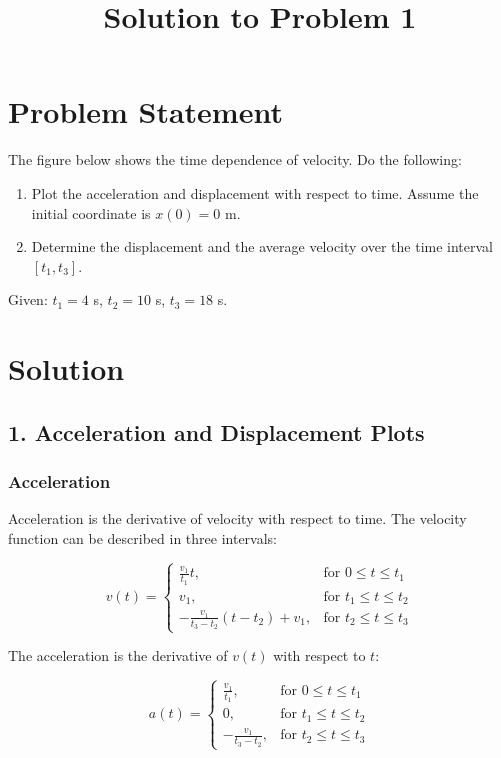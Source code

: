\documentclass{article}
\begin{document}
\title{Solution to Problem 1}
\author{}
\date{}
\maketitle

\section*{Problem Statement}
The figure below shows the time dependence of velocity. Do the following:

\begin{enumerate}
    \item Plot the acceleration and displacement with respect to time. Assume the initial coordinate is $x(0) = 0$ m.
    \item Determine the displacement and the average velocity over the time interval $[t_1, t_3]$.
\end{enumerate}

Given: $t_1 = 4$ s, $t_2 = 10$ s, $t_3 = 18$ s.

\section*{Solution}

\subsection*{1. Acceleration and Displacement Plots}

\subsubsection*{Acceleration}
Acceleration is the derivative of velocity with respect to time. The velocity function can be described in three intervals:

\[
v(t) =
\begin{cases}
\frac{v_1}{t_1} t, & \text{for } 0 \leq t \leq t_1 \\
v_1, & \text{for } t_1 \leq t \leq t_2 \\
-\frac{v_1}{t_3 - t_2} (t - t_2) + v_1, & \text{for } t_2 \leq t \leq t_3
\end{cases}
\]

The acceleration is the derivative of $v(t)$ with respect to $t$:

\[
a(t) =
\begin{cases}
\frac{v_1}{t_1}, & \text{for } 0 \leq t \leq t_1 \\
0, & \text{for } t_1 \leq t \leq t_2 \\
-\frac{v_1}{t_3 - t_2}, & \text{for } t_2 \leq t \leq t_3
\end{cases}
\]
\end{document}
